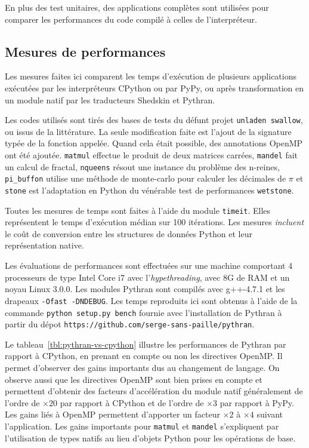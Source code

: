 \documentclass[renpar]{compas2013}
\begin{document}
En plus des test unitaires, des applications complètes sont utilisées pour
comparer les performances du code compilé à celles de l'interpréteur.

\subsection{Mesures de performances}

Les mesures faites ici comparent les temps d'exécution de plusieurs
applications exécutées par les interpréteurs CPython ou par PyPy, ou après
transformation en un module natif par les traducteurs Shedskin et Pythran.

Les codes utilisés sont tirés des bases de tests du défunt projet
\texttt{unladen swallow}, ou issus de la littérature. La seule modification
faite est l'ajout de la signature typée de la fonction appelée. Quand cela
était possible, des annotations OpenMP ont été ajoutée. \texttt{matmul}
effectue le produit de deux matrices carrées, \texttt{mandel} fait un calcul de
fractal, \texttt{nqueens} résout une instance du problème des n-reines,
\texttt{pi\_buffon} utilise une méthode de monte-carlo pour calculer les
décimales de $\pi$ et \texttt{stone} est l'adaptation en Python du vénérable
test de performances \texttt{wetstone}.

Toutes les mesures de temps sont faites à l'aide du module
\texttt{timeit}. Elles représentent le temps d'exécution médian sur 100
itérations. Les mesures \emph{incluent} le coût de conversion entre les
structures de données Python et leur représentation native.

Les évaluations de performances sont effectuées sur une machine comportant
4 processeurs de type Intel Core i7 avec l'\emph{hypethreading}, avec 8G
de RAM et un noyau Linux 3.0.0.
Les modules Pythran sont compilés avec g++-4.7.1 et les drapeaux
\texttt{-Ofast -DNDEBUG}.
Les temps reproduits ici sont obtenus à l'aide de la commande
\texttt{python setup.py bench} fournie avec l'installation de Pythran à partir du dépot \texttt{https://github.com/serge-sans-paille/pythran}.

Le tableau~\ref{tbl:pythran-vs-cpython} illustre les performances de
Pythran par rapport à CPython, en prenant en compte ou non les directives
OpenMP. Il permet d'observer des gains importants dus au changement de
langage. On observe aussi que les directives OpenMP sont bien prises en
compte et permettent d'obtenir des facteurs d'accélération du module natif
généralement de l'ordre de $\times20$ par rapport à CPython et de l'ordre
de $\times3$ par rapport à PyPy. Les gains liés à OpenMP permettent
d'apporter un facteur $\times2$ à $\times4$ suivant l'application. Les
gains importants pour \texttt{matmul} et \texttt{mandel} s'expliquent par
l'utilisation de types natifs au lieu d'objets Python pour les opérations
de base.
\end{document}
